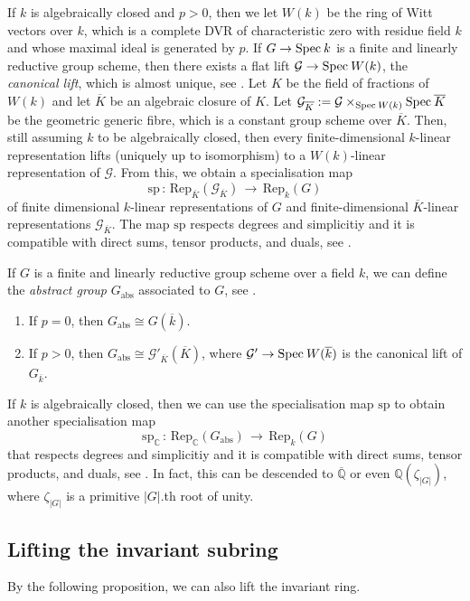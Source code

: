 \documentclass[reqno]{amsart}
\newcommand{\QQ}{{\mathbb{Q}}}
\newcommand{\CC}{{\mathbb{C}}}
\newcommand{\Spec}{{\rm Spec}\:}
\theoremstyle{definition}
\theoremstyle{plain}
\begin{document}
If $k$ is algebraically closed and $p>0$, then we let
$W(k)$ be the ring of Witt vectors over $k$, which is a complete
DVR of characteristic zero with residue field $k$ and 
whose maximal ideal is generated by $p$.
If $G\to\Spec k$ is a finite and linearly reductive group
scheme, then there exists a flat 
lift $\mathcal{G}\to\Spec W(k)$, the \emph{canonical lift},
which is almost
unique, see \cite[Proposition 2.4]{LRQ}.
Let $K$ be the field of fractions of $W(k)$ and
let $\overline{K}$ be an algebraic closure of $K$.
Let $\mathcal{G}_{\overline{K}}:=\mathcal{G}\times_{\Spec W(k)}\Spec\overline{K}$
be the geometric generic fibre, which is a constant group
scheme over $\overline{K}$.
Then, still assuming $k$ to be algebraically closed,
then every finite-dimensional $k$-linear representation lifts
(uniquely up to isomorphism) to a $W(k)$-linear representation of $\mathcal{G}$.
From this, we obtain a specialisation map
$$
\mathrm{sp}\,:\,\mathrm{Rep}_{\overline{K}}(\mathcal{G}_{\overline{K}})
\,\to\,\mathrm{Rep}_k(G)
$$
of finite dimensional $k$-linear representations of $G$
and finite-dimensional $\overline{K}$-linear representations 
$\mathcal{G}_{\overline{K}}$.
The map $\mathrm{sp}$ respects degrees and simplicitiy and 
it is compatible with direct sums, tensor products, and duals,
see \cite[Proposition 2.9]{LRQ}.

If $G$ is a finite and linearly reductive group scheme
over a field $k$, we can define the 
\emph{abstract group} $G_{\mathrm{abs}}$
associated to $G$, see \cite[Definition 2.2]{LRQ}.
\begin{enumerate}
\item If $p=0$, then $G_{\mathrm{abs}}\cong G(\overline{k})$.
\item If $p>0$, then $G_{\mathrm{abs}}\cong \mathcal{G}'_{\overline{K}}(\overline{K})$,
where $\mathcal{G}'\to\Spec W(\overline{k})$ is the canonical lift
of $G_{\overline{k}}$.
\end{enumerate}
If $k$ is algebraically closed, then we can use the specialisation map $\mathrm{sp}$
to obtain another specialisation map
$$
\mathrm{sp}_\CC\,:\,\mathrm{Rep}_\CC(G_{\mathrm{abs}}) \,\to\,
\mathrm{Rep}_k(G)
$$
that respects degrees and simplicitiy and 
it is compatible with direct sums, tensor products, and duals,
see \cite[Corollary 2.11]{LRQ}.
In fact, this can be descended to $\overline{\QQ}$ or
even $\QQ(\zeta_{|G|})$, where $\zeta_{|G|}$ is a primitive $|G|$.th
root of unity.

\subsection{Lifting the invariant subring}
By the following proposition, we can also lift the invariant ring.
\end{document}
